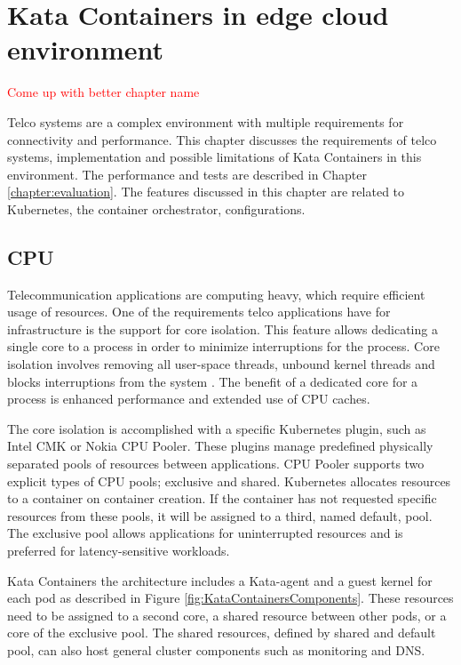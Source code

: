 \chapter{Kata Containers in edge cloud environment}
\label{chapter:implementation}

\textcolor{red}{Come up with better chapter name}

Telco systems are a complex environment with multiple requirements for connectivity and performance. This chapter discusses the requirements of telco systems, implementation and possible limitations of Kata Containers in this environment. The performance and tests are described in Chapter \ref{chapter:evaluation}. The features discussed in this chapter are related to Kubernetes, the container orchestrator, configurations.

\section{CPU}

Telecommunication applications are computing heavy, which require efficient usage of resources. One of the requirements telco applications have for infrastructure is the support for core isolation. This feature allows dedicating a single core to a process in order to minimize interruptions for the process. Core isolation involves removing all user-space threads, unbound kernel threads and blocks interruptions from the system \cite{CPUisolation}. The benefit of a dedicated core for a process is enhanced performance and extended use of CPU caches.

The core isolation is accomplished with a specific Kubernetes plugin, such as Intel CMK\cite{IntelCMK} or Nokia CPU Pooler\cite{NokiaCPUPooler}. These plugins manage predefined physically separated pools of resources between applications. CPU Pooler supports two explicit types of CPU pools; exclusive and shared. Kubernetes allocates resources to a container on container creation. If the container has not requested specific resources from these pools, it will be assigned to a third, named default, pool. The exclusive pool allows applications for uninterrupted resources and is preferred for latency-sensitive workloads.

Kata Containers the architecture includes a Kata-agent and a guest kernel for each pod as described in Figure \ref{fig:KataContainersComponents}. These resources need to be assigned to a second core, a shared resource between other pods, or a core of the exclusive pool. The shared resources, defined by shared and default pool, can also host general cluster components such as monitoring and DNS.

